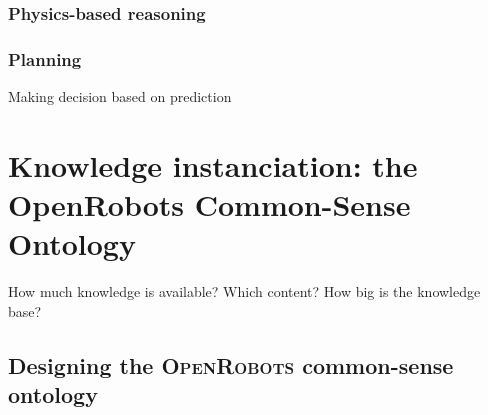 \subsubsection{Physics-based reasoning}
\subsubsection{Planning}
Making decision based on prediction





\section{Knowledge instanciation: the OpenRobots Common-Sense Ontology}

How much knowledge is available? Which content? How big is the knowledge base?

\subsection{Designing the \textsc{OpenRobots} common-sense ontology}
\label{sect|commonsense-design}


